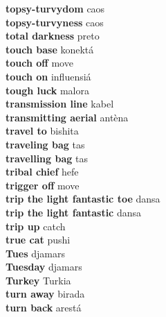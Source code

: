 \textbf{ topsy-turvydom  } caos \\
\textbf{ topsy-turvyness  } caos \\
\textbf{ total darkness  } preto \\
\textbf{ touch base  } konektá \\
\textbf{ touch off  } move \\
\textbf{ touch on  } influensiá \\
\textbf{ tough luck  } malora \\
\textbf{ transmission line  } kabel \\
\textbf{ transmitting aerial  } antèna \\
\textbf{ travel to  } bishita \\
\textbf{ traveling bag  } tas \\
\textbf{ travelling bag  } tas \\
\textbf{ tribal chief  } hefe \\
\textbf{ trigger off  } move \\
\textbf{ trip the light fantastic toe  } dansa \\
\textbf{ trip the light fantastic  } dansa \\
\textbf{ trip up  } catch \\
\textbf{ true cat  } pushi \\
\textbf{ Tues  } djamars \\
\textbf{ Tuesday  } djamars \\
\textbf{ Turkey  } Turkia \\
\textbf{ turn away  } birada \\
\textbf{ turn back  } arestá \\
